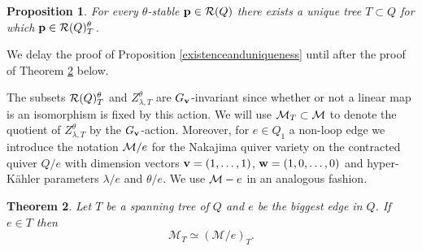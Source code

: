 \documentclass{amsart}
\newtheorem{thm}{Theorem}[section]
\newtheorem{prop}[thm]{Proposition}
\theoremstyle{definition}
\begin{document}

\begin{prop}\label{prop:existenceanduniqueness}
For every $\theta$-stable $\mathbf{p} \in \mathcal{R}(Q)$ there exists a unique tree $T \subset Q$ for which $\mathbf{p} \in \mathcal{R}(Q)_T^\theta$. 
\end{prop}

We delay the proof of Proposition \ref{existenceanduniqueness} until after the proof of Theorem \ref{thm:contract} below.

The subsets $\mathcal{R}(Q)_T^\theta$ and $Z_{\lambda,T}^\theta$ are $G_{\mathbf{v}}$-invariant since whether or not a linear map is an isomorphism is fixed by this action.
We will use $\mathcal{M}_T \subset \mathcal{M}$ to denote the quotient of $Z_{\lambda,T}^\theta$ by the $G_{\mathbf{v}}$-action.
Moreover, for $e\in Q_1$ a non-loop edge we introduce the notation $\mathcal{M}/e$ for the Nakajima quiver variety on the contracted quiver $Q/e$ with dimension vectors $\mathbf{v}= (1,\ldots,1)$, $\mathbf{w}= (1,0,\ldots,0)$ and hyper-K\"ahler parameters $\lambda/e$ and $\theta/e$.
We use $\mathcal{M}-e$ in an analogous fashion.

\begin{thm}\label{thm:contract}
Let $T$ be a spanning tree of $Q$ and $e$ be the biggest edge in $Q$. 
If $e \in T$ then $$\mathcal{M}_T \simeq (\mathcal{M}/e)_T.$$
\end{thm}
\end{document}
